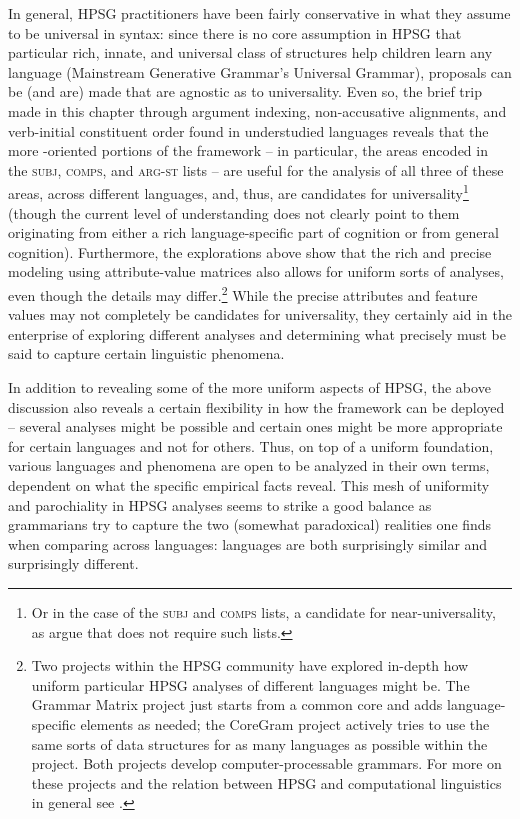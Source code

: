 \documentclass[output=paper,biblatex,babelshorthands,newtxmath,draftmode,colorlinks,citecolor=brown]{langscibook}
\begin{document}
In general, HPSG practitioners have been fairly conservative in what they assume to be universal in
syntax: since there is no core assumption in HPSG that particular rich, innate, and universal class
of structures help children learn any language (Mainstream Generative Grammar's Universal
Grammar\indexug), proposals can be (and are) made that are agnostic as to universality. Even so, the
brief trip made in this chapter through argument indexing, non-accusative alignments, and
verb-initial constituent order found in understudied languages reveals that the more
-oriented portions of the framework -- in particular, the areas encoded in the
\textsc{subj}, \textsc{comps}, and \textsc{arg-st} lists -- are useful for the analysis of all three
of these areas, across different languages, and, thus, are candidates for universality\footnote{Or
  in the case of the \textsc{subj} and \textsc{comps} lists, a candidate for near-universality, as
  \citet{KM15} argue that  does not require such lists.} (though the current level of
understanding does not clearly point to them originating from either a rich language-specific part
of cognition or from general cognition). Furthermore, the explorations above show that the rich and
precise modeling using attribute-value matrices also allows for uniform sorts of analyses, even
though the details may differ.\footnote{Two projects within the HPSG community have explored
  in-depth how uniform particular HPSG analyses of different languages might be. The Grammar Matrix
  project \citep{BDFPS2010a-u} just starts from a common core and adds language-specific elements as
  needed; the CoreGram project \citep{MuellerCoreGram} actively tries to use the same sorts of data
  structures for as many languages as possible within the project. Both projects develop
  computer-processable grammars. For more on these projects and the relation between HPSG and
  computational linguistics in general see .} While the precise attributes and
feature values may not completely be candidates for universality, they certainly aid in the
enterprise of exploring different analyses and determining what precisely must be said to capture
certain linguistic phenomena.

In addition to revealing some of the more uniform aspects of HPSG, the above discussion also reveals a certain flexibility in how the framework can be deployed -- several analyses might be possible and certain ones might be more appropriate for certain languages and not for others. Thus, on top of a uniform foundation, various languages and phenomena are open to be analyzed in their own terms, dependent on what the specific empirical facts reveal. This mesh of uniformity and parochiality in HPSG analyses seems to strike a good balance as grammarians try to capture the two (somewhat paradoxical) realities one finds when comparing across languages: languages are both surprisingly similar and surprisingly different.                 
\end{document}

